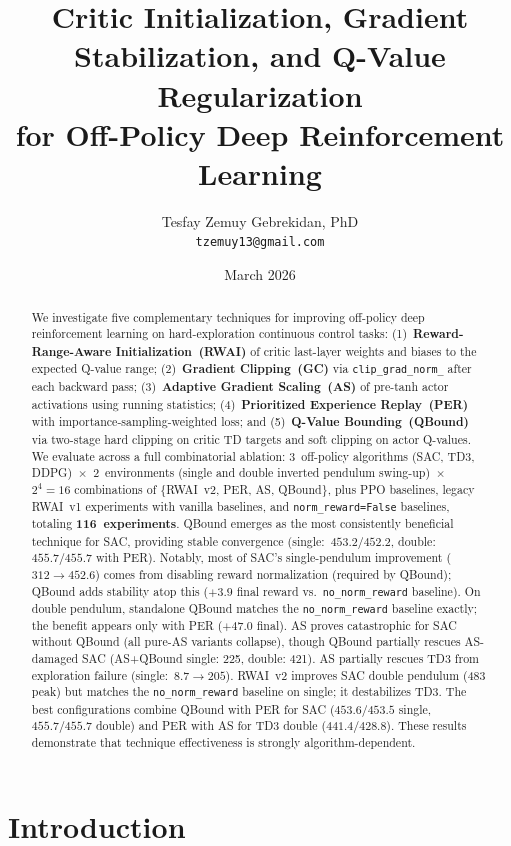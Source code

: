 \documentclass[11pt,a4paper]{article}
\title{Critic Initialization, Gradient Stabilization, and Q-Value Regularization\\for Off-Policy Deep Reinforcement Learning}
\author{Tesfay Zemuy Gebrekidan, PhD\\
\texttt{tzemuy13@gmail.com}}
\date{March 2026}
\begin{document}
\maketitle

\begin{abstract}
We investigate five complementary techniques for improving off-policy deep reinforcement learning on hard-exploration continuous control tasks: (1)~\textbf{Reward-Range-Aware Initialization~(RWAI)} of critic last-layer weights and biases to the expected Q-value range; (2)~\textbf{Gradient Clipping~(GC)} via \texttt{clip\_grad\_norm\_} after each backward pass; (3)~\textbf{Adaptive Gradient Scaling~(AS)} of pre-tanh actor activations using running statistics; (4)~\textbf{Prioritized Experience Replay~(PER)} with importance-sampling-weighted loss; and (5)~\textbf{Q-Value Bounding~(QBound)} via two-stage hard clipping on critic TD targets and soft clipping on actor Q-values. We evaluate across a full combinatorial ablation: 3~off-policy algorithms (SAC, TD3, DDPG)~$\times$~2~environments (single and double inverted pendulum swing-up)~$\times$~$2^4 = 16$ combinations of \{RWAI~v2, PER, AS, QBound\}, plus PPO baselines, legacy RWAI~v1 experiments with vanilla baselines, and \texttt{norm\_reward=False} baselines, totaling \textbf{116~experiments}. QBound emerges as the most consistently beneficial technique for SAC, providing stable convergence (single:~$453.2/452.2$, double:~$455.7/455.7$ with PER). Notably, most of SAC's single-pendulum improvement ($312 \to 452.6$) comes from disabling reward normalization (required by QBound); QBound adds stability atop this ($+3.9$ final reward vs.\ \texttt{no\_norm\_reward} baseline). On double pendulum, standalone QBound matches the \texttt{no\_norm\_reward} baseline exactly; the benefit appears only with PER ($+47.0$ final). AS proves catastrophic for SAC without QBound (all pure-AS variants collapse), though QBound partially rescues AS-damaged SAC (AS+QBound single: 225, double: 421). AS partially rescues TD3 from exploration failure (single:~$8.7 \to 205$). RWAI~v2 improves SAC double pendulum (483 peak) but matches the \texttt{no\_norm\_reward} baseline on single; it destabilizes TD3. The best configurations combine QBound with PER for SAC ($453.6/453.5$ single, $455.7/455.7$ double) and PER with AS for TD3 double ($441.4/428.8$). These results demonstrate that technique effectiveness is strongly algorithm-dependent.
\end{abstract}

\section{Introduction}
\end{document}
